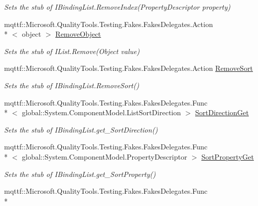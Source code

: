 \begin{DoxyCompactItemize}
\begin{DoxyCompactList}\small\item\em Sets the stub of I\-Binding\-List.\-Remove\-Index(\-Property\-Descriptor property)\end{DoxyCompactList}\item 
mqttf\-::\-Microsoft.\-Quality\-Tools.\-Testing.\-Fakes.\-Fakes\-Delegates.\-Action\\*
$<$ object $>$ \hyperlink{class_system_1_1_component_model_1_1_fakes_1_1_stub_i_binding_list_aebba0abeb566a273f8c0f6a5714838b9}{Remove\-Object}
\begin{DoxyCompactList}\small\item\em Sets the stub of I\-List.\-Remove(\-Object value)\end{DoxyCompactList}\item 
mqttf\-::\-Microsoft.\-Quality\-Tools.\-Testing.\-Fakes.\-Fakes\-Delegates.\-Action \hyperlink{class_system_1_1_component_model_1_1_fakes_1_1_stub_i_binding_list_ad6648d82160b496b215d45e10485c5a3}{Remove\-Sort}
\begin{DoxyCompactList}\small\item\em Sets the stub of I\-Binding\-List.\-Remove\-Sort()\end{DoxyCompactList}\item 
mqttf\-::\-Microsoft.\-Quality\-Tools.\-Testing.\-Fakes.\-Fakes\-Delegates.\-Func\\*
$<$ global\-::\-System.\-Component\-Model.\-List\-Sort\-Direction $>$ \hyperlink{class_system_1_1_component_model_1_1_fakes_1_1_stub_i_binding_list_ab5d3822775a2d3b4cdf7bd91cd7c55c0}{Sort\-Direction\-Get}
\begin{DoxyCompactList}\small\item\em Sets the stub of I\-Binding\-List.\-get\-\_\-\-Sort\-Direction()\end{DoxyCompactList}\item 
mqttf\-::\-Microsoft.\-Quality\-Tools.\-Testing.\-Fakes.\-Fakes\-Delegates.\-Func\\*
$<$ global\-::\-System.\-Component\-Model.\-Property\-Descriptor $>$ \hyperlink{class_system_1_1_component_model_1_1_fakes_1_1_stub_i_binding_list_af1446b787c8ed130bd46c3c2be0c0e69}{Sort\-Property\-Get}
\begin{DoxyCompactList}\small\item\em Sets the stub of I\-Binding\-List.\-get\-\_\-\-Sort\-Property()\end{DoxyCompactList}\item 
mqttf\-::\-Microsoft.\-Quality\-Tools.\-Testing.\-Fakes.\-Fakes\-Delegates.\-Func\\*

\end{DoxyCompactItemize}
